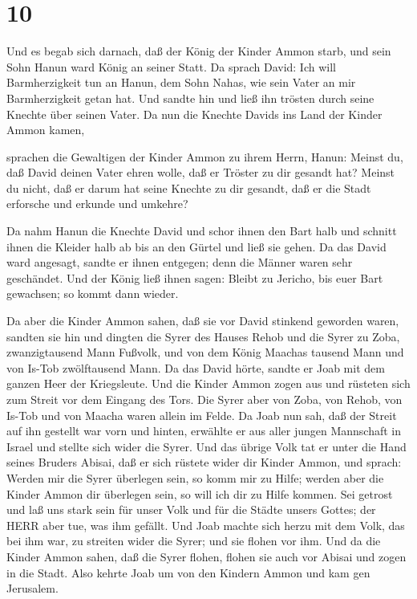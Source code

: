 \hypertarget{section-9}{%
\section{10}\label{section-9}}

 Und es begab sich darnach, daß der König der Kinder Ammon
starb, und sein Sohn Hanun ward König an seiner Statt.  Da
sprach David: Ich will Barmherzigkeit tun an Hanun, dem Sohn Nahas, wie
sein Vater an mir Barmherzigkeit getan hat. Und sandte hin und ließ ihn
trösten durch seine Knechte über seinen Vater. Da nun die Knechte Davids
ins Land der Kinder Ammon kamen,

 sprachen die Gewaltigen der Kinder Ammon zu ihrem Herrn,
Hanun: Meinst du, daß David deinen Vater ehren wolle, daß er Tröster zu
dir gesandt hat? Meinst du nicht, daß er darum hat seine Knechte zu dir
gesandt, daß er die Stadt erforsche und erkunde und umkehre?

 Da nahm Hanun die Knechte David und schor ihnen den Bart
halb und schnitt ihnen die Kleider halb ab bis an den Gürtel und ließ
sie gehen.  Da das David ward angesagt, sandte er ihnen
entgegen; denn die Männer waren sehr geschändet. Und der König ließ
ihnen sagen: Bleibt zu Jericho, bis euer Bart gewachsen; so kommt dann
wieder.

 Da aber die Kinder Ammon sahen, daß sie vor David stinkend
geworden waren, sandten sie hin und dingten die Syrer des Hauses Rehob
und die Syrer zu Zoba, zwanzigtausend Mann Fußvolk, und von dem König
Maachas tausend Mann und von Is-Tob zwölftausend Mann.  Da
das David hörte, sandte er Joab mit dem ganzen Heer der Kriegsleute.
 Und die Kinder Ammon zogen aus und rüsteten sich zum Streit
vor dem Eingang des Tors. Die Syrer aber von Zoba, von Rehob, von Is-Tob
und von Maacha waren allein im Felde.  Da Joab nun sah, daß
der Streit auf ihn gestellt war vorn und hinten, erwählte er aus aller
jungen Mannschaft in Israel und stellte sich wider die Syrer.
 Und das übrige Volk tat er unter die Hand seines Bruders
Abisai, daß er sich rüstete wider dir Kinder Ammon,  und
sprach: Werden mir die Syrer überlegen sein, so komm mir zu Hilfe;
werden aber die Kinder Ammon dir überlegen sein, so will ich dir zu
Hilfe kommen.  Sei getrost und laß uns stark sein für unser
Volk und für die Städte unsers Gottes; der HERR aber tue, was ihm
gefällt.  Und Joab machte sich herzu mit dem Volk, das bei
ihm war, zu streiten wider die Syrer; und sie flohen vor ihm.
 Und da die Kinder Ammon sahen, daß die Syrer flohen,
flohen sie auch vor Abisai und zogen in die Stadt. Also kehrte Joab um
von den Kindern Ammon und kam gen Jerusalem.

